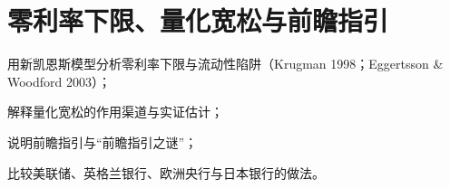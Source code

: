 \chapter{零利率下限、量化宽松与前瞻指引}\label{ch:zlb}

\begin{chapterguide}
\begin{guidegoals}
\item 用新凯恩斯模型分析零利率下限与流动性陷阱（Krugman 1998；Eggertsson \& Woodford 2003）；
\item 解释量化宽松的作用渠道与实证估计；
\item 说明前瞻指引与“前瞻指引之谜”；
\item 比较美联储、英格兰银行、欧洲央行与日本银行的做法。
\end{guidegoals}
\end{chapterguide}

\chapterstub
